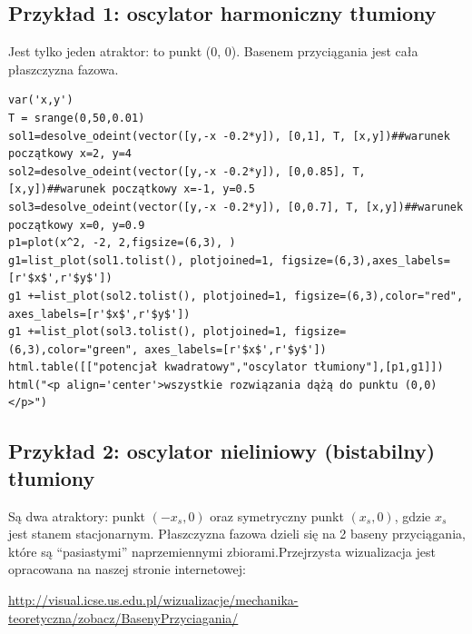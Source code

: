 \documentclass[a4paper,12pt,polish]{sphinxmanual}
\begin{document}
\subsection{Przykład 1: oscylator harmoniczny tłumiony}
\label{ch1/chI024:przyklad-1-oscylator-harmoniczny-tlumiony}
Jest tylko jeden atraktor: to punkt (0, 0). Basenem przyciągania jest cała płaszczyzna fazowa.


\begin{verbatim}
var('x,y')
T = srange(0,50,0.01)
sol1=desolve_odeint(vector([y,-x -0.2*y]), [0,1], T, [x,y])##warunek początkowy x=2, y=4
sol2=desolve_odeint(vector([y,-x -0.2*y]), [0,0.85], T, [x,y])##warunek początkowy x=-1, y=0.5
sol3=desolve_odeint(vector([y,-x -0.2*y]), [0,0.7], T, [x,y])##warunek początkowy x=0, y=0.9
p1=plot(x^2, -2, 2,figsize=(6,3), )
g1=list_plot(sol1.tolist(), plotjoined=1, figsize=(6,3),axes_labels=[r'$x$',r'$y$'])
g1 +=list_plot(sol2.tolist(), plotjoined=1, figsize=(6,3),color="red", axes_labels=[r'$x$',r'$y$'])
g1 +=list_plot(sol3.tolist(), plotjoined=1, figsize=(6,3),color="green", axes_labels=[r'$x$',r'$y$'])
html.table([["potencjał kwadratowy","oscylator tłumiony"],[p1,g1]])
html("<p align='center'>wszystkie rozwiązania dążą do punktu (0,0) </p>")
\end{verbatim}



\subsection{Przykład 2: oscylator nieliniowy (bistabilny)  tłumiony}
\label{ch1/chI024:przyklad-2-oscylator-nieliniowy-bistabilny-tlumiony}
Są dwa  atraktory:  punkt $(-x_s, 0)$ oraz symetryczny punkt $(x_s, 0)$, gdzie $x_s$ jest stanem stacjonarnym. Płaszczyzna fazowa dzieli się na 2 baseny przyciągania, które są ``pasiastymi'' naprzemiennymi zbiorami.Przejrzysta wizualizacja jest opracowana na naszej stronie internetowej:

\href{http://visual.icse.us.edu.pl/wizualizacje/mechanika-teoretyczna/zobacz/BasenyPrzyciagania/}{http://visual.icse.us.edu.pl/wizualizacje/mechanika-teoretyczna/zobacz/BasenyPrzyciagania/}
\end{document}
